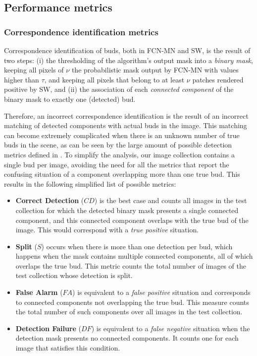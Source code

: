 \documentclass[a4paper,authoryear,review]{elsarticle}
\begin{document}
	\subsection{Performance metrics}
	\label{sec:metrics}
	
	\subsubsection{Correspondence identification metrics}
	\label{subsec:detectmetrics}
	
	Correspondence identification of buds, both in  FCN-MN and SW, is the result of two steps: (i)  the thresholding of the algorithm’s output mask into a \emph{binary mask}, keeping all pixels of $\nu$ the probabilistic mask output by FCN-MN with values higher than $\tau$, and keeping all pixels that belong to at least $\nu$ patches rendered positive by SW, and (ii) the association of each \emph{connected component} of the binary mask to exactly one (detected) bud. 
	
	Therefore, an incorrect correspondence identification is the result of an incorrect matching of detected components with actual buds in the image. This matching can become extremely complicated when there is an unknown number of true buds in the scene, as can be seen by the large amount of possible detection metrics defined in \citet{oguz2017dice}. To simplify the analysis, our image collection contains a single bud per image, avoiding the need for all the metrics that report the confusing situation of a component overlapping more than one true bud. This results in the following simplified list of possible metrics:
	
	\begin{itemize}
		\item \textbf{Correct Detection} ($CD$) is the best case and counts all images in the test collection for which the detected binary mask presents a single connected component, and this connected component overlaps with the true bud of the image. This would correspond with a \emph{true positive} situation.
		
		\item \textbf{Split} ($S$) occurs when there is more than one detection per bud, which happens  when the mask contains multiple connected components, all of which overlaps the true bud. This metric counts the total number of images of the test collection whose detection is split.
		
		\item \textbf{False Alarm} ($FA$) is equivalent to a \emph{false positive} situation and corresponds to connected components not overlapping the true bud. This measure counts the total number of such components over all images in the test collection.
		
		\item \textbf{Detection Failure} ($DF$) is equivalent to a \emph{false negative} situation when the detection mask presents no connected components. It counts one for each image that satisfies this condition.
	\end{itemize}
	
\end{document}
